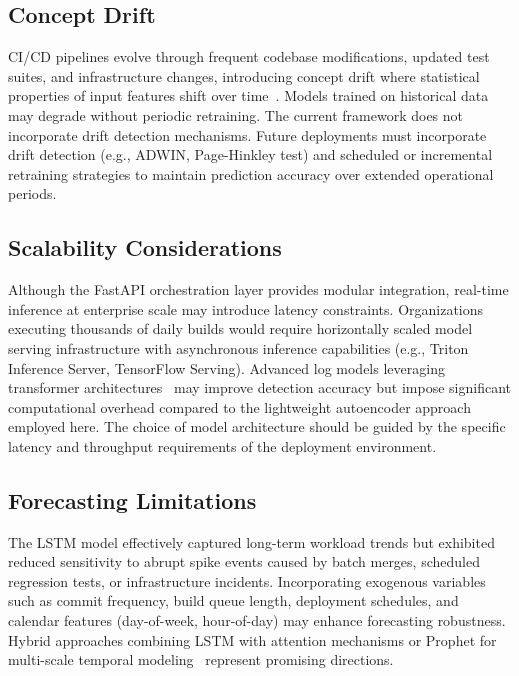 \documentclass[sn-nature]{sn-jnl}
\theoremstyle{thmstyleone}
\theoremstyle{thmstyletwo}
\theoremstyle{thmstylethree}
\begin{document}
\subsection{Concept Drift}\label{subsec:drift}

CI/CD pipelines evolve through frequent codebase modifications, updated test suites, and infrastructure changes, introducing concept drift where statistical properties of input features shift over time~\cite{bayram2025trustworthy, abdullahi2025conceptdrift}. Models trained on historical data may degrade without periodic retraining. The current framework does not incorporate drift detection mechanisms. Future deployments must incorporate drift detection (e.g., ADWIN, Page-Hinkley test) and scheduled or incremental retraining strategies to maintain prediction accuracy over extended operational periods.

\subsection{Scalability Considerations}\label{subsec:scalability}

Although the FastAPI orchestration layer provides modular integration, real-time inference at enterprise scale may introduce latency constraints. Organizations executing thousands of daily builds would require horizontally scaled model serving infrastructure with asynchronous inference capabilities (e.g., Triton Inference Server, TensorFlow Serving). Advanced log models leveraging transformer architectures~\cite{liao2025logtransformer, vaswani2017attention} may improve detection accuracy but impose significant computational overhead compared to the lightweight autoencoder approach employed here. The choice of model architecture should be guided by the specific latency and throughput requirements of the deployment environment.

\subsection{Forecasting Limitations}\label{subsec:forecastlimit}

The LSTM model effectively captured long-term workload trends but exhibited reduced sensitivity to abrupt spike events caused by batch merges, scheduled regression tests, or infrastructure incidents. Incorporating exogenous variables such as commit frequency, build queue length, deployment schedules, and calendar features (day-of-week, hour-of-day) may enhance forecasting robustness. Hybrid approaches combining LSTM with attention mechanisms or Prophet for multi-scale temporal modeling~\cite{guruge2025prophet} represent promising directions.
\end{document}
